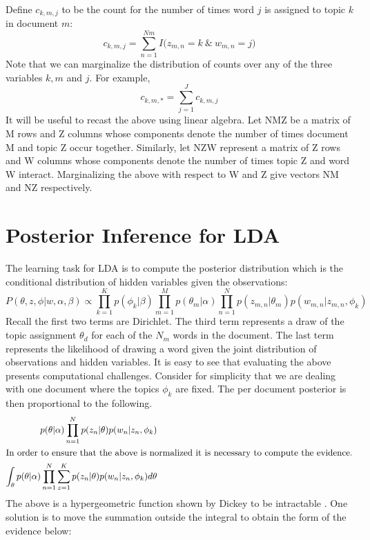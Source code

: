 \documentclass{article}%
\theoremstyle{definition}
\begin{document}
Define $c_{k,m,j}$ to be the count for the number of times word $j$ is assigned to topic $k$ in document $m$:
\[ c_{k,m,j} = \sum\limits_{n=1}^{Nm}I\Big(z_{m,n} = k \ \& \ w_{m,n} = j \Big) \]
Note that we can marginalize the distribution of counts over any of the three variables $k, m$ and $j$. For example,
\[ c_{k,m,*} = \sum\limits_{j=1}^{J}c_{k,m,j} \]
It will be useful to recast the above using linear algebra. Let NMZ be a matrix of M rows and Z columns whose components denote the number of times document M and topic Z occur together. Similarly, let NZW represent a matrix of Z rows and W columns whose components denote the number of times topic Z and word W interact. Marginalizing the above with respect to W and Z give vectors NM and NZ respectively. 

\section{Posterior Inference for LDA}
\label{sec:inference}
The learning task for LDA is to compute the posterior distribution which is the conditional distribution of hidden variables given the observations:
\begin{equation}
P(\theta, z, \phi | w, \alpha, \beta) \propto \prod\limits_{k=1}^{K}p(\phi_k | \beta) \prod\limits_{m=1}^{M}p(\theta_m|\alpha)\prod\limits_{n=1}^{N}p(z_{m,n}|\theta_m)p(w_{m,n}|z_{m,n},\phi_k)
\end{equation}
Recall the first two terms are Dirichlet. The third term represents a draw of the topic assignment $\theta_d$ for each of the $N_m$ words in the document. The last term represents the likelihood of drawing a word given the joint distribution of observations and hidden variables. It is easy to see that evaluating the above presents computational challenges. Consider for simplicity that we are dealing with one document where the topics $\phi_k$ are fixed. The per document posterior is then proportional to the following.
\begin{align}
p(\theta|\alpha)\prod\limits_{n=1}^{N}p(z_n|\theta)p(w_n|z_n,\phi_k) \\
\intertext{In order to ensure that the above is normalized it is necessary to compute the evidence.}
\int_\theta p(\theta|\alpha)\prod\limits_{n=1}^{N}\sum\limits_{z=1}^{K}p(z_n|\theta)p(w_n|z_n,\phi_k)d\theta
\end{align}
The above is a hypergeometric function shown by Dickey to be intractable \cite{10.2307/2288131}. One solution is to move the summation outside the integral to obtain the form of the evidence below:
\end{document}
